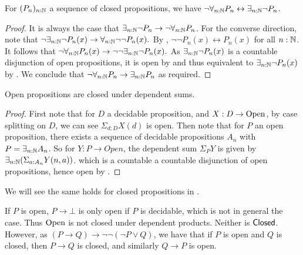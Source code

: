 \begin{lemma}\label{ClosedMarkov}
  For $(P_n)_{n:\mathbb{N}}$ a sequence of closed propositions, we have 
  $\neg \forall_{n:\mathbb{N}} P_n \leftrightarrow  \exists_{n:\mathbb{N}} \neg P_n$. 
\end{lemma}
\begin{proof}
  It is always the case that $\exists_{n:\mathbb{N}}\neg P_n \to \neg \forall_{n:\mathbb{N}} P_n$. 
  For the converse direction,
  note that $\neg \exists_{n:\mathbb{N}} \neg P_n(x) \to \forall_{n:\mathbb{N}} \neg \neg P_n(x).$
  By , $\neg \neg  P_n(x)\leftrightarrow P_n(x)$ for all $n:\mathbb{N}$. 
  It follows that 
  $\neg \forall_{n:\mathbb{N}} P_n(x)\to 
  \neg \neg \exists_{n:\mathbb{N}} \neg P_n(x).$
  As $\exists_{n:\mathbb{N}}\neg P_n(x)$ is a countable disjunction of open propositions, 
  it is open by  and thus equivalent to 
  $\exists_{n:\mathbb{N}} \neg P_n(x)$ by .
  We conclude that $\neg \forall_{n:\mathbb{N}} P_n \to \exists_{n:\mathbb{N}} P_n$ as required. 
\end{proof} 









\begin{lemma}\label{OpenDependentSums}
  Open propositions are closed under dependent sums.
\end{lemma}
\begin{proof}
  First note that for $D$ a decidable proposition, and $X:D \to \mathrm{Open}$,
  by case splitting on $D$, we can see 
  $\Sigma_{d:D} X(d)$ is open.
%
  Then note that for $P$ an open proposition, 
  there exists a sequence of decidable propositions $A_n$ with 
  $P = \exists_{n:\mathbb{N}} A_n $.
%
  So for $Y : P \to Open $, the dependent sum $\Sigma_P Y$ is given by 
  $\exists_{n:\mathbb{N}} (\Sigma_{a:A_n} Y(n,a))$. 
  which is a countable a countable disjunction of open propositions, 
  hence open by .
\end{proof}

We will see the same holds for closed propositions in .

\begin{remark}\label{ImplicationOpenClosed}
  If $P$ is open, $P \to \bot$ is only open if $P$ is decidable, which is not in general the case. 
  Thus $\mathrm{Open}$ is not closed under dependent products. Neither is $\mathsf{Closed}$. 
  However, as $(P\to Q)  \to \neg \neg (\neg P \vee Q)$,
  we have that if $P$ is open and $Q$ is closed, then $P\to Q$ is closed, and similarly $Q\to P$ is open.
\end{remark}
